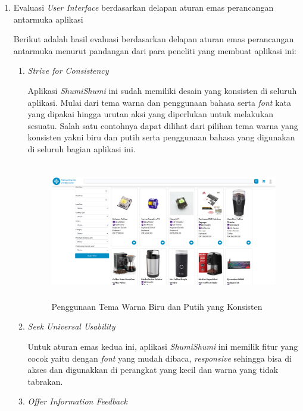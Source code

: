 \documentclass[a4paper]{article}
\begin{document}
\begin{enumerate}
    \item Evaluasi \textit{User Interface} berdasarkan delapan aturan emas perancangan antarmuka aplikasi
    
    Berikut adalah hasil evaluasi berdasarkan delapan aturan emas perancangan antarmuka menurut pandangan dari para peneliti yang membuat aplikasi ini:
    
    \begin{enumerate}
        \item \textit{Strive for Consistency}
        
        Aplikasi \textit{ShumiShumi} ini sudah memiliki desain yang konsisten di seluruh aplikasi. Mulai dari tema warna dan penggunaan bahasa serta \textit{font} kata yang dipakai hingga urutan aksi yang diperlukan untuk melakukan sesuatu. Salah satu contohnya dapat dilihat dari pilihan tema warna yang konsisten yakni biru dan putih serta penggunaan bahasa yang digunakan di seluruh bagian aplikasi ini. 

        \begin{figure}[h]
            \centering
            \includegraphics*[height=6cm]{images/prosedur pengunaan aplikasi/Search.png}
            \caption{Penggunaan Tema Warna Biru dan Putih yang Konsisten}
        \end{figure}

        \item \textit{Seek Universal Usability}
        
        Untuk aturan emas kedua ini, aplikasi \textit{ShumiShumi} ini memilik fitur yang cocok yaitu dengan \textit{font} yang mudah dibaca, \textit{responsive} sehingga bisa di akses dan digunakkan di perangkat yang kecil dan warna yang tidak tabrakan.

        \item \textit{Offer Information Feedback}
        

\end{enumerate}
\end{enumerate}
\end{document}

